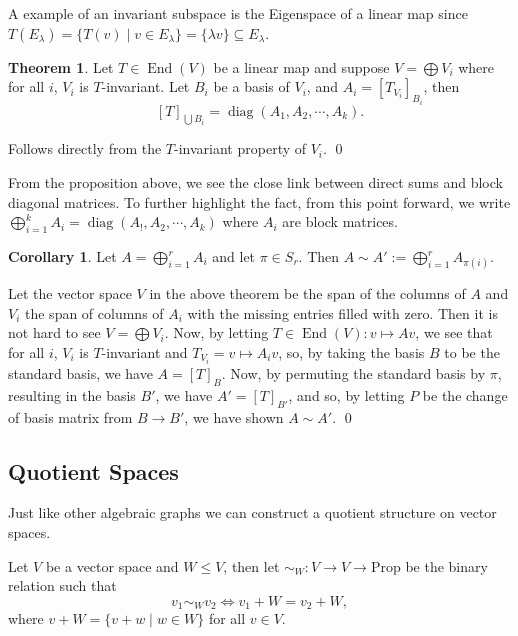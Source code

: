 \documentclass[
]{article}
\theoremstyle{definition}
\newtheorem{theorem}{Theorem}
\newtheorem{corollary}{Corollary}[theorem]
\theoremstyle{definition}
\begin{document}
A example of an invariant subspace is the Eigenspace of a linear map
since
\(T(E_\lambda) = \{ T(v) \mid v \in E_\lambda \} = \{\lambda v \} \subseteq E_\lambda\).

\begin{theorem}
  Let \(T \in \mathop{\mathrm{End}}(V)\) be a linear map and suppose \(V = \bigoplus V_i\) where 
  for all \(i\), \(V_i\) is \(T\)-invariant. Let \(B_i\) be a basis of \(V_i\),
  and \(A_i = [T_{V_i}]_{B_i}\), then 
  \[[T]_{\bigcup B_i} = \mathop{\mathrm{diag}}(A_1, A_2, \cdots, A_k).\] 
\end{theorem}
\proof

Follows directly from the \(T\)-invariant property of \(V_i\). \qed

From the proposition above, we see the close link between direct sums
and block diagonal matrices. To further highlight the fact, from this
point forward, we write
\(\bigoplus_{i = 1}^k A_i = \mathop{\mathrm{diag}}(A_!, A_2, \cdots, A_k)\)
where \(A_i\) are block matrices.

\begin{corollary}
  Let \(A = \bigoplus_{i = 1}^r A_i\) and let \(\pi \in S_r\). Then 
  \(A \sim A' := \bigoplus_{i = 1}^r A_{\pi(i)}\).
\end{corollary}
\proof

Let the vector space \(V\) in the above theorem be the span of the
columns of \(A\) and \(V_i\) the span of columns of \(A_i\) with the
missing entries filled with zero. Then it is not hard to see
\(V = \bigoplus V_i\). Now, by letting
\(T \in \mathop{\mathrm{End}}(V) : v \mapsto A v\), we see that for all
\(i\), \(V_i\) is \(T\)-invariant and \(T_{V_i} = v \mapsto A_i v\), so,
by taking the basis \(B\) to be the standard basis, we have
\(A = [T]_B\). Now, by permuting the standard basis by \(\pi\),
resulting in the basis \(B'\), we have \(A' = [T]_{B'}\), and so, by
letting \(P\) be the change of basis matrix from \(B \to B'\), we have
shown \(A \sim A'\). \qed

\hypertarget{quotient-spaces}{%
\subsection{Quotient Spaces}\label{quotient-spaces}}

Just like other algebraic graphs we can construct a quotient structure
on vector spaces.

Let \(V\) be a vector space and \(W \le V\), then let
\(\sim_W : V \to V \to \text{Prop}\) be the binary relation such that
\[v_1 \sim_W v_2 \iff v_1 + W = v_2 + W,\] where
\(v + W = \{v + w \mid w \in W\}\) for all \(v \in V\).
\end{document}
